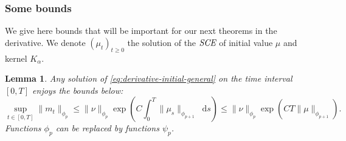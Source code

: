 \documentclass[11pt,a4paper]{article}
\newcommand{\SCE}{\emph{SCE}}
\newcommand{\Proc}[1]{\left(#1\right)_{t\geq 0}}
\newcommand{\dd}{\mathop{}\!\mathrm{d}}
\newtheorem{lemma}[theorem]{Lemma}
\begin{document}
\subsubsection{Some bounds}
We give here bounds that will be important for our next theorems in the derivative. We denote $\Proc{\mu_t}$ the solution of the $\SCE$ of initial value $\mu$ and kernel $K_\alpha$.
\begin{lemma}\label{lem:bound_derivative}
    Any solution of \eqref{eq:derivative-initial-general} on the time interval $[0,T]$ enjoys the bounds below:
    \[ \sup\limits_{t \in [0,T]}\| m_t\|_{\phi_p} \leq \| \nu\|_{\phi_p} \exp{\left( C\int_0^T\| \mu_s\|_{\phi_{p+1}} \dd s \right)} \leq \| \nu\|_{\phi_p} \exp{\left( CT\| \mu\|_{\phi_{p+1}}\right)}.\]
    Functions $\phi_p$ can be replaced by functions $\psi_p$.
\end{lemma}
\end{document}
